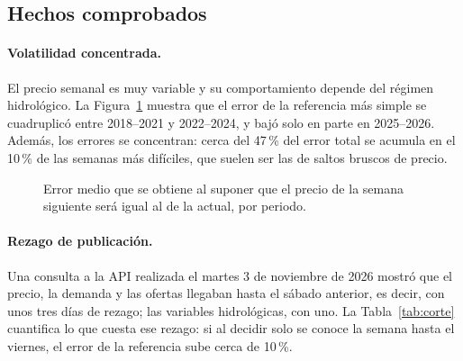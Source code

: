 \documentclass[11pt,letterpaper]{article}
\begin{document}
\subsection{Hechos comprobados}

\paragraph{Volatilidad concentrada.} El precio semanal es muy variable y
su comportamiento depende del régimen hidrológico. La
Figura~\ref{fig:periodos} muestra que el error de la referencia más
simple se cuadruplicó entre 2018--2021 y 2022--2024, y bajó solo en parte
en 2025--2026. Además, los errores se concentran: cerca del 47\,\% del
error total se acumula en el 10\,\% de las semanas más difíciles, que
suelen ser las de saltos bruscos de precio.

\begin{figure}[H]
\centering
{}
\caption{Error medio que se obtiene al suponer que el precio de la
semana siguiente será igual al de la actual, por periodo.}
\label{fig:periodos}
\end{figure}

\paragraph{Rezago de publicación.} Una consulta a la API realizada el
martes 3 de noviembre de 2026 mostró que el precio, la demanda y las
ofertas llegaban hasta el sábado anterior, es decir, con unos tres días
de rezago; las variables hidrológicas, con uno. La
Tabla~\ref{tab:corte} cuantifica lo que cuesta ese rezago: si al decidir
solo se conoce la semana hasta el viernes, el error de la referencia
sube cerca de 10\,\%.
\end{document}
